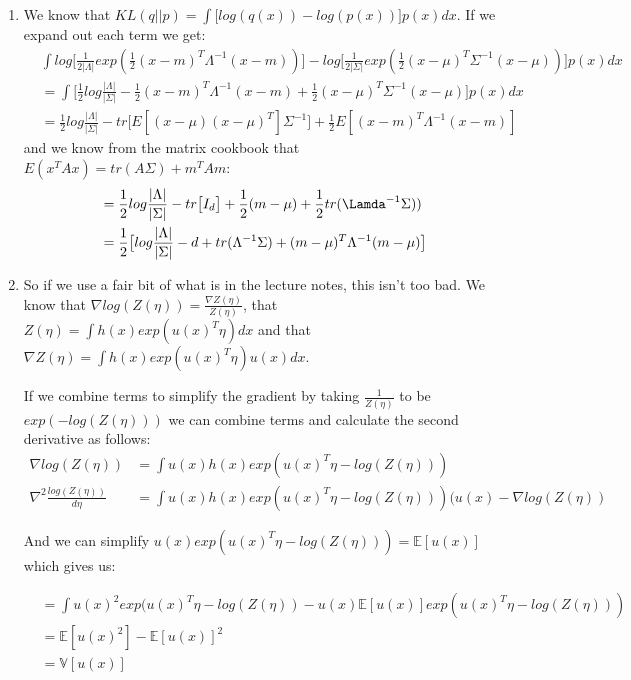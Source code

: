 \documentclass[11pt,a4paper]{article}
\begin{document}
\begin{enumerate}
			\item We know that $KL(q||p) = \int \big[ log(q(x)) - log(p(x)) \big] p(x) dx$. If we expand out each term we get:
			\begin{align*}
				&\int log \Big[ \frac{1}{2| \Lambda |}exp(\frac{1}{2}(x-m)^T \Lambda^{-1}(x-m)) \Big] - log \Big[ \frac{1}{2| \Sigma |}exp(\frac{1}{2}(x-\mu)^T \Sigma^{-1}(x-\mu)) \Big] p(x)dx \\
				&= \int \Big[ \frac{1}{2} log \frac{| \Lambda |}{| \Sigma |} - \frac{1}{2}(x-m)^T \Lambda^{-1} (x-m) + \frac{1}{2}(x-\mu)^T \Sigma^{-1} (x-\mu) \Big] p(x) dx \\
				&= \frac{1}{2} log \frac{| \Lambda |}{| \Sigma | }-tr\big[ E[(x-\mu)(x-\mu)^T] \Sigma^{-1}\big] + \frac{1}{2} E[(x-m)^T \Lambda^{-1}(x-m)]
			\end{align*}
			and we know from the matrix cookbook that $E(x^TAx) = tr(A\Sigma)+m^TAm$:
			\begin{align*}
				&= \frac{1}{2} log \frac{| \Lambda |}{| \Sigma | }-tr\big[ I_d \big] + \frac{1}{2} (m-\mu) + \frac{1}{2}tr(\Lamda^{-1}\Sigma)) \\
				&= \frac{1}{2} \big[log \frac{| \Lambda |}{| \Sigma | } - d + tr(\Lambda^{-1}\Sigma) + (m- \mu)^T \Lambda^{-1}(m- \mu)\big]
			\end{align*}
			\item So if we use a fair bit of what is in the lecture notes, this isn't too bad. We know that $\nabla log(Z(\eta)) = \frac{\nabla Z(\eta)}{Z(\eta)}$, that $Z(\eta)= \int h(x)exp(u(x)^T \eta)dx$ and that $\nabla Z(\eta) = \int h(x) exp(u(x)^T\eta) u(x) dx$.
			
			If we combine terms to simplify the gradient by taking $\frac{1}{Z(\eta)}$ to be $exp(-log(Z(\eta)))$ we can combine terms and calculate the second derivative as follows:
			\begin{align*}
				\nabla log(Z(\eta)) &= \int u(x) h(x) exp(u(x)^T\eta - log(Z(\eta))) \\
				\nabla^2 \frac{log(Z(\eta))}{d\eta} &= \int u(x) h(x) exp(u(x)^T\eta - log(Z(\eta)))(u(x)-\nabla log(Z(\eta))
			\end{align*}
			
			And we can simplify $u(x)exp(u(x)^T\eta - log(Z(\eta))) = \mathbb{E}[u(x)]$ which gives us:
			
			\begin{align*}
			&= \int u(x)^2 exp(u(x)^T\eta - log(Z(\eta)) - u(x)\mathbb{E}[u(x)]exp(u(x)^T\eta - log(Z(\eta))) \\
			&= \mathbb{E}[u(x)^2] - \mathbb{E}[u(x)]^2 \\
			&= \mathbb{V}[u(x)]
			\end{align*}
			

\end{enumerate}
\end{document}
